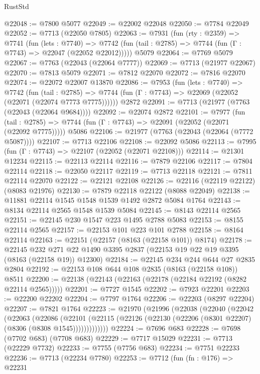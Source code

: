 \begin{lexlean}{RustStd}
\begin{coremodule}
@22048 := @7800 @5077
@22049 := @22002 @22048
@22050 := @7784 @22049
@22052 := @7713 (@22050 @7805)
@22063 := @7931
    (fun (rty : @2359) =>
    @7741
      (fun (lets : @7740) =>
      @7742 (fun (tail : @2785) => @7744 (fun (Γ : @7743) => @22047 (@22052 @22012)))))
    @5079
@22064 := @7769 @5079
@22067 := @7763 (@22043 (@22064 @7777))
@22069 := @7713 (@21977 @22067)
@22070 := @7813 @5079
@22071 := @7812 @22070
@22072 := @7816 @22070
@22074 := @22072 @22007 @13870
@22086 := @7953
    (fun (lets : @7740) =>
    @7742
      (fun (tail : @2785) =>
      @7744 (fun (Γ : @7743) => @22069 (@22052 (@22071 (@22074 @7773 @7775))))))
    @2872
@22091 := @7713 (@21977 (@7763 (@22043 (@22064 @9684))))
@22092 := @22074 @2872
@22101 := @7977
    (fun (tail : @2785) => @7744 (fun (Γ : @7743) => @22091 (@22052 (@22071 (@22092 @7775)))))
    @5086
@22106 := @21977 (@7763 (@22043 (@22064 (@7772 @5087))))
@22107 := @7713 @22106
@22108 := @22092 @5086
@22113 := @7995 (fun (Γ : @7743) => @22107 (@22052 (@22071 @22108)))
@22114 := @21301 @12234
@22115 := @22113 @22114
@22116 := @7879 @22106
@22117 := @7804 @22114
@22118 := @22050 @22117
@22119 := @7713 @22118
@22121 := @7811 @22114 @22070
@22122 := @22121 @22108
@22126 := @22116 (@22119 @22122) (@8083 @21976)
@22130 := @7879 @22118 @22122 (@8088 @22049)
@22138 := @11881 @22114 @1545 @1548 @1539 @1492 @2872 @5084 @1764
@22143 := @8134 @22114 @2565 @1548 @1539 @5084
@22145 := @8143 @22114 @2565
@22151 := @22145 @230 @1547 @223 @1495 @2788 @5083
@22153 := @8155 @22114 @2565
@22157 := @22153 @101 @223 @101 @2788
@22158 := @8164 @22114
@22163 := @22151 (@22157 (@8163 (@22158 @101)) @8174)
@22178 := @22145
    @232
    @271
    @22
    @1490
    @3395
    @2837
    (@22153 @19 @22 @19 @3395 (@8163 (@22158 @19)) @12300)
@22184 := @22145 @234 @244 @644 @27 @2835 @2804
@22192 := @22153 @108 @644 @108 @2835 (@8163 (@22158 @108)) @8511
@22200 := @22138 (@22143 (@22163 (@22178 (@22184 @22192 (@8282 @22114 @2565)))))
@22201 := @7727 @1545
@22202 := @7923 @22201
@22203 := @22200 @22202
@22204 := @7797 @1764
@22206 := @22203 (@8297 @22204)
@22207 := @7821 @1764
@22223 := @21970
    (@21996
      (@22038
        (@22040
          (@22042
            (@22063
              (@22086
                (@22101
                  (@22115 (@22126 (@22130 (@22206 (@8301 @22207) (@8306 (@8308 @1545)))))))))))))
@22224 := @7696 @683
@22228 := @7698 (@7702 @683) (@7708 @683)
@22229 := @7717 @15029
@22231 := @7713 (@22229 @7732)
@22233 := @7755 (@7756 @683)
@22234 := @7751 @22233
@22236 := @7713 (@22234 @7780)
@22253 := @7712
    (fun (fn : @176) =>
    @22231

\end{coremodule}
\end{lexlean}
